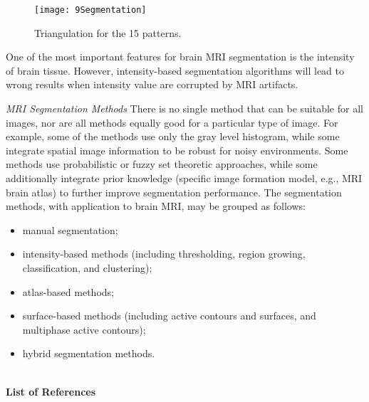 \begin{figure}[H]
\centering{}\texttt{[image: 9Segmentation]}\caption{Triangulation for the 15 patterns. \label{fig:Segment}}
\end{figure}

One of the most important features for brain MRI segmentation is the
intensity of brain tissue. However, intensity-based segmentation algorithms
will lead to wrong results when intensity value are corrupted by MRI
artifacts.

\textit{MRI Segmentation Methods} There is no single method that can
be suitable for all images, nor are all methods equally good for a
particular type of image. For example, some of the methods use only
the gray level histogram, while some integrate spatial image information
to be robust for noisy environments. Some methods use probabilistic
or fuzzy set theoretic approaches, while some additionally integrate
prior knowledge (specific image formation model, e.g., MRI brain atlas)
to further improve segmentation performance. The segmentation methods,
with application to brain MRI, may be grouped as follows: 
\begin{itemize}
\item manual segmentation; 
\item intensity-based methods (including thresholding, region growing, classification,
and clustering); 
\item atlas-based methods; 
\item surface-based methods (including active contours and surfaces, and
multiphase active contours); 
\item hybrid segmentation methods. 
\end{itemize}
\hfill{}\\
\textbf{List of References}\\
\cite{09a1}